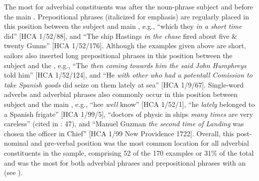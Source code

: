 {The most  for adverbial constituents was after the noun-phrase subject and before the main . Prepositional phrases (italicized for emphasis) are regularly placed in this position between the subject and main , e.g., “which they \textit{in a short time} did” [HCA 1/52/88], and “The ship Hastings \textit{in the chase} fired about five \& twenty Gunns” [HCA 1/52/176]. Although the examples given above are short, sailors also inserted long prepositional phrases in this position between the subject and the , e.g., “The  \textit{then coming towards him the said John Humphreys} told him” [HCA 1/52/124], and “He \textit{with other who had a potentall Comission to take Spanish goods} did seize on them lately at sea” [HCA 1/9/67]. Single-word adverbs and adverbial phrases also commonly occur in this position between subject and the main , e.g., “hee \textit{well} know” [HCA 1/52/1], “he \textit{lately} belonged to a Spanish frigate” [HCA 1/99/5], “doctors of physic in ships \textit{many times} are very careless” (cited in \citealt{Brown2011}: 47), and “Manuel Guzman \textit{the second time of Landing} was chosen the officer in Chief” [HCA 1/99 New Providence 1722]. Overall, this post-nominal and pre-verbal position was the most common location for all adverbial constituents in the sample, comprising 52 of the 170 examples or 31\% of the total and was the most  for both adverbial phrases and prepositional phrases with an  (see ). 

}
